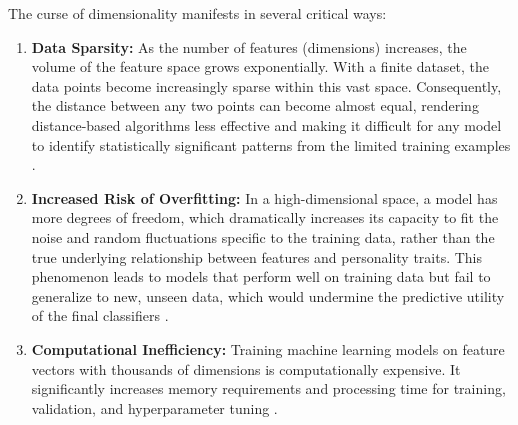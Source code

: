 The curse of dimensionality manifests in several critical ways:
\begin{enumerate}
	\item \textbf{Data Sparsity:} As the number of features (dimensions) increases, the volume of the feature space grows exponentially. With a finite dataset, the data points become increasingly sparse within this vast space. Consequently, the distance between any two points can become almost equal, rendering distance-based algorithms less effective and making it difficult for any model to identify statistically significant patterns from the limited training examples \citep{bellman1961, aggarwal2001}.
	
	\item \textbf{Increased Risk of Overfitting:} In a high-dimensional space, a model has more degrees of freedom, which dramatically increases its capacity to fit the noise and random fluctuations specific to the training data, rather than the true underlying relationship between features and personality traits. This phenomenon leads to models that perform well on training data but fail to generalize to new, unseen data, which would undermine the predictive utility of the final classifiers \citep{hastie2009}.
	
	\item \textbf{Computational Inefficiency:} Training machine learning models on feature vectors with thousands of dimensions is computationally expensive. It significantly increases memory requirements and processing time for training, validation, and hyperparameter tuning \citep{hastie2009}.
\end{enumerate}

